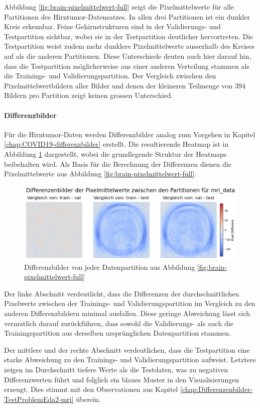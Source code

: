 Abbildung \ref{fig:brain-pixelmittelwert-full} zeigt die Pixelmittelwerte für alle Partitionen des Hirntumor-Datensatzes. In allen drei Partitionen ist ein dunkler Kreis erkennbar. Feine Gehirnstrukturen sind in der Validierungs- und Testpartition sichtbar, wobei sie in der Testpartition deutlicher hervortreten. Die Testpartition weist zudem mehr dunklere Pixelmittelwerte ausserhalb des Kreises auf als die anderen Partitionen. Diese Unterschiede deuten auch hier darauf hin, dass die Testpartition möglicherweise aus einer anderen Verteilung stammen als die Trainings- und Validierungspartition. Der Vergleich zwischen den Pixelmittelwertbildern aller Bilder und denen der kleineren Teilmenge von 394 Bildern pro Partition zeigt keinen grossen Unterschied.

\paragraph{Differenzbilder} \label{chap:brain-differenzenbilder}
Für die Hirntumor-Daten werden Differenzbilder analog zum Vorgehen in Kapitel \ref{chap:COVID19-differenzbilder} erstellt. Die resultierende Heatmap ist in Abbildung \ref{fig:brain-differenzenbilder} dargestellt, wobei die grundlegende Struktur der Heatmaps beibehalten wird. Als Basis für die Berechnung der Differenzen dienen die Pixelmittelwerte aus Abbildung \ref{fig:brain-pixelmittelwert-full}.

\begin{figure}[H]
    \centering
    \includegraphics[width=\linewidth]{01-images/03-data/brain-differenzenbilder.png}
    \caption{Differenzbilder von jeder Datenpartition aus Abbildung \ref{fig:brain-pixelmittelwert-full}}
    \label{fig:brain-differenzenbilder}
\end{figure}

Der linke Abschnitt verdeutlicht, dass die Differenzen der durchschnittlichen Pixelwerte zwischen der Trainings- und Validierungspartition im Vergleich zu den anderen Differenzbildern minimal ausfallen. Diese geringe Abweichung lässt sich vermutlich darauf zurückführen, dass sowohl die Validierungs- als auch die Trainingspartition aus derselben ursprünglichen Datenpartition stammen.

Der mittlere und der rechte Abschnitt verdeutlichen, dass die Testpartition eine starke Abweichung zu den Trainings- und Validierungspartition aufweist. Letztere zeigen im Durchschnitt tiefere  Werte als die Testdaten, was zu negativen Differenzwerten führt und folglich ein blaues Muster in den Visualisierungen erzeugt. Dies stimmt mit den Observationen aus Kapitel \ref{chap:Differenzenbilder-TestProblemEda2-mri} überein. 

\newpage